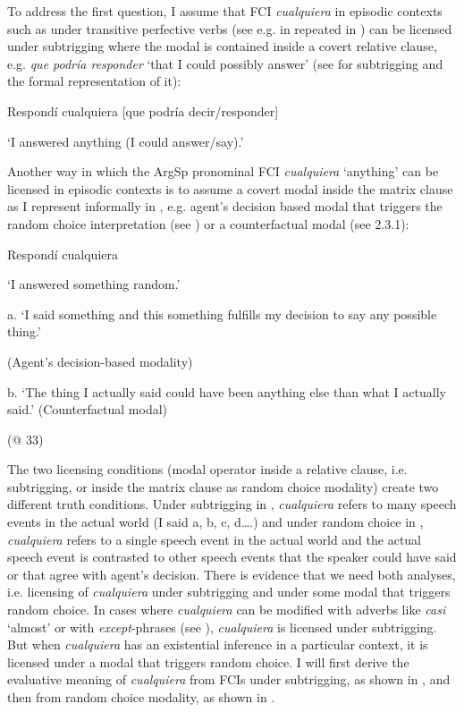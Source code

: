 \documentclass[output=paper]{langscibook}
\begin{document}
  To address the first question, I assume that FCI \textit{cualquiera} in episodic contexts such as under transitive perfective verbs (see e.g.  in  repeated in ) can be licensed under subtrigging where the modal is contained inside a covert relative clause, e.g. \textit{que podría responder} ‘that I could possibly answer’ (see  for subtrigging and the formal representation of it):

\label{bkm:Ref63461360}    Respondí cualquiera  [que podría decir/responder]

    ‘I answered anything (I could answer/say).’

Another way in which the ArgSp pronominal FCI \textit{cualquiera} ‘anything’ can be licensed in episodic contexts is to assume a covert modal inside the matrix clause as I represent informally in , e.g. agent’s decision based modal that triggers the random choice interpretation (see ) or a counterfactual modal (see 2.3.1):

\label{bkm:Ref63461220}    Respondí cualquiera

    ‘I answered something random.’

  a.  ‘I said something and this something fulfills my decision to say any possible thing.’ 

(Agent’s decision-based modality)

  b.  ‘The thing I actually said could have been anything else than what I actually said.’ (Counterfactual modal) 

    (@ 33)

The two licensing conditions (modal operator inside a relative clause, i.e. subtrigging, or inside the matrix clause as random choice modality) create two different truth conditions. Under subtrigging in , \textit{cualquiera} refers to many speech events in the actual world (I said a, b, c, d….) and under random choice in , \textit{cualquiera} refers to a single speech event in the actual world and the actual speech event is contrasted to other speech events that the speaker could have said or that agree with agent’s decision. There is evidence that we need both analyses, i.e. licensing of \textit{cualquiera} under subtrigging and under some modal that triggers random choice. In cases where \textit{cualquiera} can be modified with adverbs like \textit{casi} ‘almost’ or with \textit{except}{}-phrases (see ), \textit{cualquiera} is licensed under subtrigging. But when \textit{cualquiera} has an existential inference in a particular context, it is licensed under a modal that triggers random choice. I will first derive the evaluative meaning of \textit{cualquiera} from FCIs under subtrigging, as shown in , and then from random choice modality, as shown in .
\end{document}

